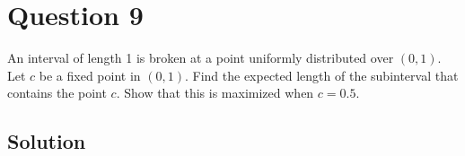 \section*{Question 9}

An interval of length 1 is broken at a point uniformly distributed over \( (0,1) \).
Let \( c \) be a fixed point in \( (0,1) \).
Find the expected length of the subinterval that contains the point \( c \).
Show that this is maximized when \( c=0.5 \).

\subsection*{Solution}
